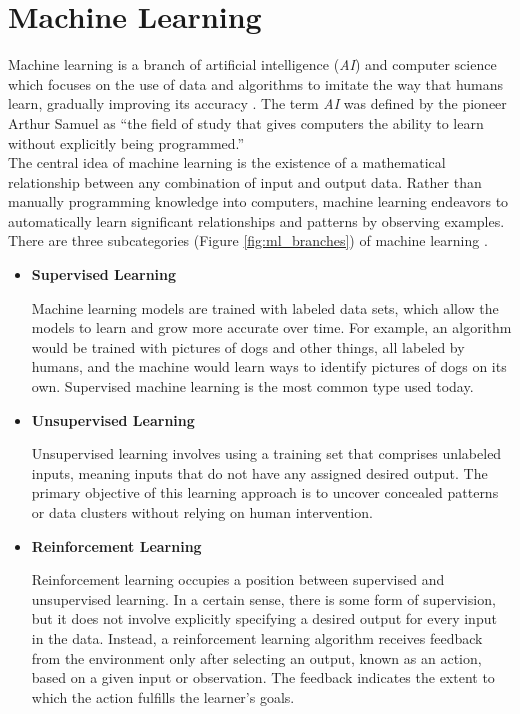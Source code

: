 \newpage

\section{Machine Learning}

Machine learning is a branch of artificial intelligence (\textit{AI}) and
computer science which focuses on the use of data and algorithms to imitate the
way that humans learn, gradually improving its accuracy
\cite{IBMMachineLearning}. The term \textit{AI} was defined by the pioneer
Arthur Samuel as “the field of study that gives computers the ability to learn
without explicitly being programmed.” \\

The central idea of machine learning is the existence of a mathematical
relationship between any combination of input and output data. Rather than
manually programming knowledge into computers, machine learning endeavors to
automatically learn significant relationships and patterns by observing
examples. \\

There are three subcategories (Figure \ref{fig:ml_branches}) of
machine learning \cite{MITML}.

\begin{itemize}
  \item \textbf{Supervised Learning}

    Machine learning models are trained with labeled data sets, which allow
    the models to learn and grow more accurate over time. For example, an
    algorithm would be trained with pictures of dogs and other things, all
    labeled by humans, and the machine would learn ways to identify pictures
    of dogs on its own. Supervised machine learning is the most common type
    used today.

  \item \textbf{Unsupervised Learning}

    Unsupervised learning involves using a training set that comprises
    unlabeled inputs, meaning inputs that do not have any assigned desired
    output. The primary objective of this learning approach is to uncover
    concealed patterns or data clusters without relying on human
    intervention.

  \item \textbf{Reinforcement Learning}

    Reinforcement learning occupies a position between supervised and
    unsupervised learning. In a certain sense, there is some form of
    supervision, but it does not involve explicitly specifying a desired
    output for every input in the data. Instead, a reinforcement learning
    algorithm receives feedback from the environment only after selecting an
    output, known as an action, based on a given input or observation. The
    feedback indicates the extent to which the action fulfills the learner's
    goals.

\end{itemize}

